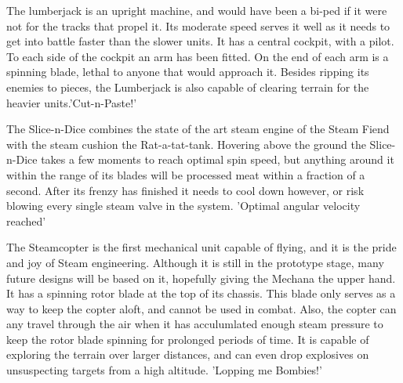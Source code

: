\documentclass[a4paper]{article}
\begin{document}
The lumberjack is an upright machine, and would have been a bi-ped if it were not for the tracks that propel it. Its moderate speed serves it well as it needs to get into battle faster than the slower units. It has a central cockpit, with a pilot. To each side of the cockpit an arm has been fitted. On the end of each arm is a spinning blade, lethal to anyone that would approach it. Besides ripping its enemies to pieces, the Lumberjack is also capable of clearing terrain for the heavier units.'Cut-n-Paste!'

The Slice-n-Dice combines the state of the art steam engine of the Steam Fiend with the steam cushion the Rat-a-tat-tank. Hovering above the ground the Slice-n-Dice takes a few moments to reach optimal spin speed, but anything around it within the range of its blades will be processed meat within a fraction of a second. After its frenzy has finished it needs to cool down however, or risk blowing every single steam valve in the system. 'Optimal angular velocity reached'

The Steamcopter is the first mechanical unit capable of flying, and it is the pride and joy of Steam engineering. Although it is still in the prototype stage, many future designs will be based on it, hopefully giving the Mechana the upper hand. It has a spinning rotor blade at the top of its chassis. This blade only serves as a way to keep the copter aloft, and cannot be used in combat. Also, the copter can any travel through the air when it has acculumlated enough steam pressure to keep the rotor blade spinning for prolonged periods of time. It is capable of exploring the terrain over larger distances, and can even drop explosives on unsuspecting targets from a high altitude. 'Lopping me Bombies!'
\end{document}
